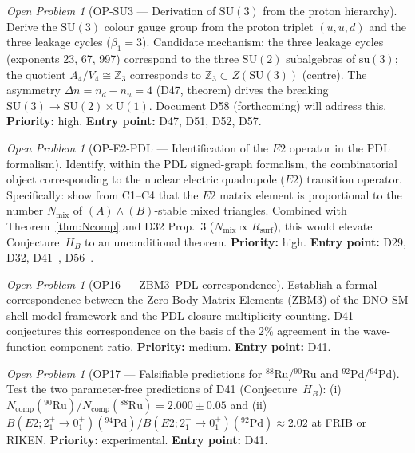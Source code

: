 \documentclass[11pt,a4paper]{article}
\theoremstyle{plain}
\theoremstyle{definition}
\theoremstyle{remark}
\newtheorem{openproblem}[theorem]{Open Problem}
\begin{document}
\begin{openproblem}[OP-SU3 --- Derivation of $\mathrm{SU}(3)$ from the proton hierarchy]
\label{op:SU3}
Derive the $\mathrm{SU}(3)$ colour gauge group from the proton triplet $(u,u,d)$ and the three leakage cycles ($\beta_1=3$). Candidate mechanism: the three leakage cycles (exponents 23, 67, 997) correspond to the three $\mathrm{SU}(2)$ subalgebras of $\mathrm{su}(3)$; the quotient $A_4/V_4 \cong \mathbb{Z}_3$ corresponds to $\mathbb{Z}_3 \subset Z(\mathrm{SU}(3))$ (centre). The asymmetry $\Delta n = n_d - n_u = 4$ (D47, theorem) drives the breaking $\mathrm{SU}(3)\to\mathrm{SU}(2)\times\mathrm{U}(1)$. Document D58 (forthcoming) will address this. \textbf{Priority:} high. \textbf{Entry point:} D47, D51, D52, D57.
\end{openproblem}

\begin{openproblem}[OP-E2-PDL --- Identification of the $E2$ operator in the PDL formalism]
\label{op:E2PDL}
Identify, within the PDL signed-graph formalism, the combinatorial object corresponding to the nuclear electric quadrupole ($E2$) transition operator. Specifically: show from C1--C4 that the $E2$ matrix element is proportional to the number $N_{\mathrm{mix}}$ of $(A)\wedge(B)$-stable mixed triangles. Combined with Theorem~\ref{thm:Ncomp} and D32 Prop.~3 ($N_{\mathrm{mix}}\propto R_{\mathrm{surf}}$), this would elevate Conjecture~$H_B$ to an unconditional theorem. \textbf{Priority:} high. \textbf{Entry point:} D29, D32, D41~\cite{D41}, D56~\cite{D56}.
\end{openproblem}

\begin{openproblem}[OP16 --- ZBM3--PDL correspondence]
\label{op:ZBM3}
Establish a formal correspondence between the Zero-Body Matrix Elements (ZBM3) of the DNO-SM shell-model framework and the PDL closure-multiplicity counting. D41 conjectures this correspondence on the basis of the $2\%$ agreement in the wave-function component ratio. \textbf{Priority:} medium. \textbf{Entry point:} D41.
\end{openproblem}

\begin{openproblem}[OP17 --- Falsifiable predictions for $^{88}$Ru/$^{90}$Ru and $^{92}$Pd/$^{94}$Pd]
\label{op:FRIB}
Test the two parameter-free predictions of D41 (Conjecture~$H_B$): (i) $N_{\mathrm{comp}}(^{90}\mathrm{Ru})/N_{\mathrm{comp}}(^{88}\mathrm{Ru})=2.000\pm0.05$ and (ii) $B(E2;2^+_1\!\to\!0^+_1)(^{94}\mathrm{Pd})/B(E2;2^+_1\!\to\!0^+_1)(^{92}\mathrm{Pd})\approx 2.02$ at FRIB or RIKEN. \textbf{Priority:} experimental. \textbf{Entry point:} D41.
\end{openproblem}
\end{document}
